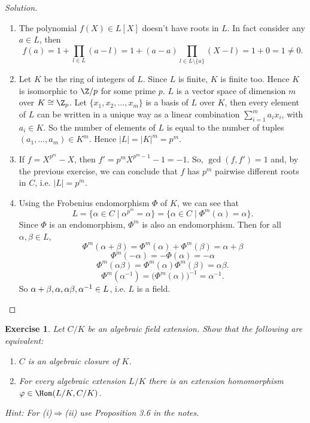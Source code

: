 \documentclass[a4paper,10pt,reqno]{amsart}
\newtheorem{ex}{Exercise}[section]
\newenvironment{sol}
  {\renewcommand\qedsymbol{$\blacksquare$}\begin{proof}[Solution]}
  {\end{proof}}
\begin{document}
\begin{sol}~
\begin{enumerate}[label=(\roman*)]
    \item The polynomial $f(X)\in L[X]$ doesn't have roots in $L$.
    In fact consider any $a\in L$, then 
    \[
    f(a)=1+\prod_{l\in L} (a-l)=1+(a-a)\prod_{l\in L\setminus \{a\}} (X-l)=1+0=1\neq 0.
    \]
    \item Let $K$ be the ring of integers of $L$. 
    Since $L$ is finite, $K$ is finite too. 
    Hence $K$ is isomorphic to $\Z/p$ for some prime $p$.
    $L$ is a vector space of dimension $m$ over $K\cong\Z_p$.
    Let $\{x_1,x_2,\dots,x_m\}$ is a 
    basis of $L$ over $K$,
    then every element of $L$ can be 
    written in a unique way as a linear 
    combination $\sum_{i=1}^m a_ix_i$, 
    with $a_i\in K$.
    So the number of elements of $L$ is
    equal to the number of tuples
    $(a_1,\dots,a_m)\in K^m$.
    Hence $|L|=|K|^m=p^m$.
    \item If $f=X^{p^m}-X$, then $f'=p^mX^{p^m-1}-1=-1$. 
    So, $ \gcd(f,f')=1$ and, by the previous exercise, we can conclude 
    that $f$ has $p^m$ pairwise different roots in $C$, i.e. $|L|=p^m$.
    \item Using the Frobenius endomorphism $\Phi $ of $K$, we can see that
    \[
    L=\{\alpha\in C\mid \alpha^{p^m}=\alpha\}=\{\alpha\in C\mid \Phi^m(\alpha)=\alpha\}.
    \]
    Since $\Phi$ is an endomorphism, $\Phi^m$ is also an endomorphism.
    Then for all $\alpha,\beta\in L$,
    \[
    \Phi^m(\alpha+\beta)=\Phi^m(\alpha)+\Phi^m(\beta)=\alpha+\beta
    \]
    \[
    \Phi^m(-\alpha)=-\Phi(\alpha)=-\alpha
    \]
    \[
    \Phi^m(\alpha\beta)=\Phi^m(\alpha)\Phi^m(\beta)=\alpha\beta.
    \]
    \[
    \Phi^m(\alpha^{-1})=\big(\Phi^m(\alpha)\big)^{-1}=\alpha^{-1}.
    \]
    So $\alpha+\beta,\-\alpha,\alpha\beta,\alpha^{-1}\in L$, i.e.
    $L$ is a field.
\end{enumerate}
\end{sol}

\begin{ex}
Let $C/K$ be an algebraic field extension.
Show that the following are equivalent:
\begin{enumerate}[label=(\roman*)]
    \item $C$ is an algebraic closure of $K$.
    \item For every algebraic extension $L/K$ there is an extension homomorphism $\varphi\in \Hom(L/K,C/K)$.
\end{enumerate}  
\noindent \textit{Hint:} For (i)$\Rightarrow$(ii) use Proposition 3.6 in the notes.
\end{ex}
\end{document}
